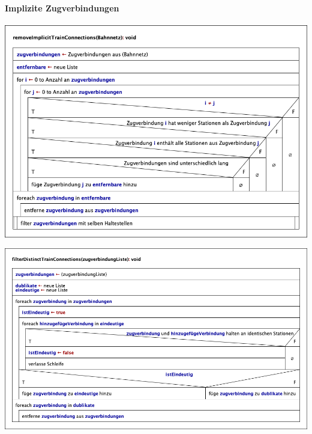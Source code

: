 \paragraph{Implizite Zugverbindungen}\label{pro:subsubsubsec:implizite-zugverbindungen}
\begin{center}
    \includegraphics[width=\linewidth]{images/Struktogramme/reducer/reduction3/removeImplicitTrainConnections.png}
    \label{pro:subsubsecpar:entfernen-von-impliziten-zugverbindungen}
\end{center}

\begin{center}
    \includegraphics[width=\linewidth]{images/Struktogramme/reducer/reduction3/filterDistinctTrainConnections.png}
    \label{pro:subsubsecpar:ueberpruefung-ob-zugverbindung-implizit-ist}
\end{center}


